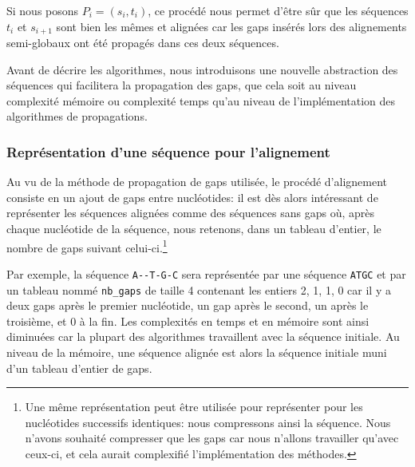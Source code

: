 Si nous posons $P_{i} = (s_{i}, t_{i})$, ce procédé nous permet d'être sûr que
les séquences $t_{i}$ et $s_{i + 1}$ sont bien les mêmes et alignées car les
gaps insérés lors des alignements semi-globaux ont été propagés dans ces deux
séquences.

Avant de décrire les algorithmes, nous introduisons une nouvelle abstraction des
séquences qui facilitera la propagation des gaps, que cela soit au niveau
complexité mémoire ou complexité temps qu'au niveau de l'implémentation des
algorithmes de propagations.

\subsubsection{Représentation d'une séquence pour l'alignement}
\label{subsubsection:repr_sequence_alignment}

Au vu de la méthode de propagation de gaps utilisée, le procédé d'alignement
consiste en un ajout de gaps entre nucléotides: il est dès alors intéressant de
représenter les séquences alignées comme des séquences sans gaps où, après
chaque nucléotide de la séquence, nous retenons, dans un tableau d'entier, le
nombre de gaps suivant celui-ci.\footnote{Une même représentation peut être
	utilisée pour représenter pour les nucléotides successifs identiques: nous
	compressons ainsi la séquence. Nous n'avons souhaité compresser que les gaps
	car nous n'allons travailler qu'avec ceux-ci, et cela aurait complexifié
l'implémentation des méthodes.}

Par exemple, la séquence \verb|A--T-G-C| sera représentée par une séquence
\verb|ATGC| et par un tableau nommé \verb|nb_gaps| de taille 4
contenant les entiers {2, 1, 1, 0} car il y a deux gaps après le premier
nucléotide, un gap après le second, un après le troisième, et 0 à la fin. Les
complexités en temps et en mémoire sont ainsi diminuées car la plupart des
algorithmes travaillent avec la séquence initiale.
Au niveau de la mémoire, une séquence alignée est alors la
séquence initiale muni d'un tableau d'entier de gaps.

